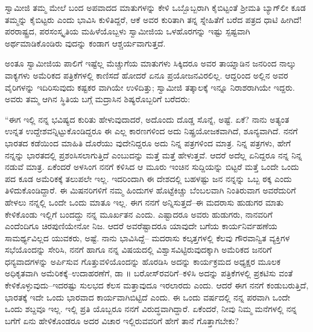 ಸ್ವಾಮೀಜಿ ತಮ್ಮ ಮೇಲೆ ಬಂದ ಅಪವಾದದ ಮಾತುಗಳನ್ನು ಕೇಳಿ ಒಬ್ಬೊಬ್ಬರಾಗಿ ಕೈಬಿಟ್ಟಂತೆ ಶ್ರೀಮತಿ ಬ್ಯಾಗ್​ಲೀ ಕೂಡ ತಮ್ಮನ್ನು ಕೈಬಿಟ್ಟರು ಎಂದು ಭಾವಿಸಿ ಕುಳಿತಿದ್ದರೆ, ಆಕೆ ಅವರ ಕುರಿತಾಗಿ ತನ್ನ ಸ್ನೇಹಿತೆಗೆ ಬರೆದ ಪತ್ರದ ಧಾಟಿ ಹೀಗಿದೆ! ಪರರಾಷ್ಟ್ರದ, ಪರಸಂಸ್ಕೃತಿಯ ಮಹಿಳೆಯೊಬ್ಬಳು ಸ್ವಾಮೀಜಿಯ ಒಳಹೊರಗನ್ನು ಇಷ್ಟು ಸ್ಪಷ್ಟವಾಗಿ ಅರ್ಥಮಾಡಿಕೊಂಡಿರು ವುದನ್ನು ಕಂಡಾಗ ಆಶ್ಚರ್ಯವಾಗುತ್ತದೆ.

ಅಂತೂ ಸ್ವಾಮೀಜಿಯ ಪಾಲಿಗೆ ಇಷ್ಟೆಲ್ಲ ಮೆಚ್ಚುಗೆಯ ಮಾತುಗಳು ಸಿಕ್ಕಿದರೂ ಅವರ ತಾಯ್ನಾಡಿನ ಜನರಿಂದ ನಾಲ್ಕು ವಾಕ್ಯಗಳು ಅಮೆರಿಕದ ಪತ್ರಿಕೆಗಳಲ್ಲಿ ಕಾಣಿಸದೆ ಹೋದರೆ ಏನೂ ಪ್ರಯೋಜನವಿರಲಿಲ್ಲ. ಆದ್ದರಿಂದ ಅಲ್ಲಿನ ಅವರ ವೈರಿಗಳನ್ನು ಇದಿರಿಸುವುದು ಕಷ್ಟಕರ ವಾಗಿಯೇ ಉಳಿದಿತ್ತು; ಸ್ವಾಮೀಜಿ ತತ್ಕಾಲಕ್ಕೆ ಇನ್ನೂ ನಿರಾಶರಾಗಿಯೇ ಇದ್ದರು. ಅವರು ತಮ್ಮ ಆಗಿನ ಸ್ಥಿತಿಯ ಬಗ್ಗೆ ಮದ್ರಾಸಿನ ಶಿಷ್ಯರೊಬ್ಬರಿಗೆ ಬರೆದರು:

“ಈಗ ಇಲ್ಲಿ ನನ್ನ ಭವಿಷ್ಯದ ಕುರಿತು ಹೇಳುವುದಾದರೆ, ಅದೊಂದು ದೊಡ್ಡ ಸೊನ್ನೆ, ಅಷ್ಟೆ. ಏಕೆ? ನಾನು ಅತ್ಯಂತ ಉನ್ನತ ಉದ್ದೇಶವನ್ನಿಟ್ಟುಕೊಂಡಿದ್ದರೂ ಈ ಎಲ್ಲ ಕಾರಣಗಳಿಂದ ಅದು ನಿಷ್ಪ್ರಯೋಜಕವಾಗಿದೆ, ಶೂನ್ಯವಾಗಿದೆ. ನನಗೆ ಭಾರತದ ಕಡೆಯಿಂದ ಮಾಹಿತಿ ದೊರೆಯು ವುದೇನಿದ್ದರೂ ಅದು ನಿನ್ನ ಪತ್ರಗಳಿಂದ ಮಾತ್ರ. ನಿನ್ನ ಪತ್ರಗಳು, ಹೇಗೆ ನನ್ನನ್ನು ಭಾರತದಲ್ಲಿ ಪ್ರಶಂಸಿಸಲಾಗುತ್ತಿದೆ ಎಂಬುದನ್ನು ಮತ್ತೆ ಮತ್ತೆ ಹೇಳುತ್ತವೆ. ಆದರೆ ಅದೆಲ್ಲ ಏನಿದ್ದರೂ ನನ್ನ ನಿನ್ನ ನಡುವೆ ಮಾತ್ರ. ಏಕೆಂದರೆ ಅಳಸಿಂಗ ನನಗೆ ಕಳಿಸಿದ ಆ ಮೂರು ಇಂಚಿನ ಸುದ್ದಿಯನ್ನು ಬಿಟ್ಟರೆ ಮತ್ತೆ ಒಂದೇ ಒಂದು ಪದ ಕೂಡ ಅಮೆರಿಕಕ್ಕೆ ತಲುಪಲೇ ಇಲ್ಲ. ಇದರಿಂದಾಗಿ ಈ ದೇಶದಲ್ಲಿ ಬಹಳಷ್ಟು ಜನ ನನ್ನನ್ನು ಒಬ್ಬ ಠಕ್ಕ ಎಂದು ತಿಳಿದುಕೊಂಡಿದ್ದಾರೆ. ಈ ಮಿಷನರಿಗಳಿಗೆ ನಮ್ಮ ಹಿಂದುಗಳ ಹೊಟ್ಟೆಕಿಚ್ಚು ಬೆಂಬಲವಾಗಿ ನಿಂತಿರುವಾಗ ಅವರೆದುರಿಗೆ ಹೇಳಲು ನನ್ನಲ್ಲಿ ಒಂದೇ ಒಂದು ಮಾತೂ ಇಲ್ಲ. ಈಗ ನನಗೆ ಅನ್ನಿಸುತ್ತದೆ–ಈ ಮದರಾಸು ಹುಡುಗರ ಮಾತು ಕೇಳಿಕೊಂಡು ಇಲ್ಲಿಗೆ ಬಂದದ್ದು ನನ್ನ ಮೂರ್ಖತನ ಎಂದು. ಎಷ್ಟಾದರೂ ಅವರು ಹುಡುಗರು, ನಾನವರಿಗೆ ಎಂದೆಂದಿಗೂ ಚಿರಪುಣಿಯೇನೋ ನಿಜ. ಆದರೆ ಅವರೆಷ್ಟಾದರೂ ಯಾವುದೇ ಬಗೆಯ ಕಾರ್ಯನಿರ್ವಹಣೆಯ ಸಾಮರ್ಥ್ಯವಿಲ್ಲದ ಯುವಕರು, ಅಷ್ಟೆ. ನಾನು ಭಾವಿಸಿದ್ದೆ– ಮದರಾಸು ಕಲ್ಕತ್ತಗಳಲ್ಲಿ ಕೆಲವು ಗೌರವಾನ್ವಿತ ವ್ಯಕ್ತಿಗಳ ಸಭೆಯೊಂದನ್ನು ಸೇರಿಸಿ, ನನಗೆ ಹಾಗೂ ನನ್ನ ವಿಷಯದಲ್ಲಿ ವಿಶ್ವಾಸವಿಟ್ಟಿರುವುದಕ್ಕಾಗಿ ಅಮೆರಿಕದ ಜನರಿಗೆ ಧನ್ಯವಾದಗಳನ್ನು ಅರ್ಪಿಸುವ ಗೊತ್ತುವಳಿಯೊಂದನ್ನು ಹೊರಡಿಸಿ ಅದನ್ನು ಕಾರ್ಯಕ್ರಮದ ಅಧ್ಯಕ್ಷರ ಮೂಲಕ ಅಧಿಕೃತವಾಗಿ ಅಮೆರಿಕಕ್ಕೆ–ಉದಾಹರಣೆಗೆ, ಡಾ ॥ ಬರೋಸ್​ರವರಿಗೆ–ಕಳಿಸಿ ಅದನ್ನು ಪತ್ರಿಕೆಗಳಲ್ಲಿ ಪ್ರಕಟಿಸು ವಂತೆ ಕೇಳಿಕೊಳ್ಳುವುದು–ಇದರಷ್ಟು ಸುಲಭದ ಕೆಲಸ ಮತ್ತಾವುದೂ ಇರಲಾರದು ಎಂದು. ಆದರೆ ಈಗ ನನಗೆ ಕಂಡುಬರುತ್ತಿದೆ, ಭಾರತಕ್ಕೆ ಇದೇ ಒಂದು ಭಾರವಾದ ಕಾರ್ಯವಾಗಿಬಿಟ್ಟಿದೆ ಎಂದು. ಈ ಒಂದು ವರ್ಷದಲ್ಲಿ ನನ್ನ ಪರವಾಗಿ ಒಂದೇ ಒಂದು ಶಬ್ದವೂ ಇಲ್ಲ. ಇಲ್ಲಿ ಪ್ರತಿ ಯೊಬ್ಬರೂ ನನಗೆ ವಿರುದ್ಧವಾಗಿದ್ದಾರೆ. ಏಕೆಂದರೆ, ನೀವು ನಿಮ್ಮ ಮನೆಗಳಲ್ಲಿ ನನ್ನ ಬಗೆಗೆ ಏನು ಹೇಳಿಕೊಂಡರೂ ಅದರ ವಿಚಾರ ಇಲ್ಲಿರುವವರಿಗೆ ಹೇಗೆ ತಾನೆ ಗೊತ್ತಾಗಬೇಕು?

